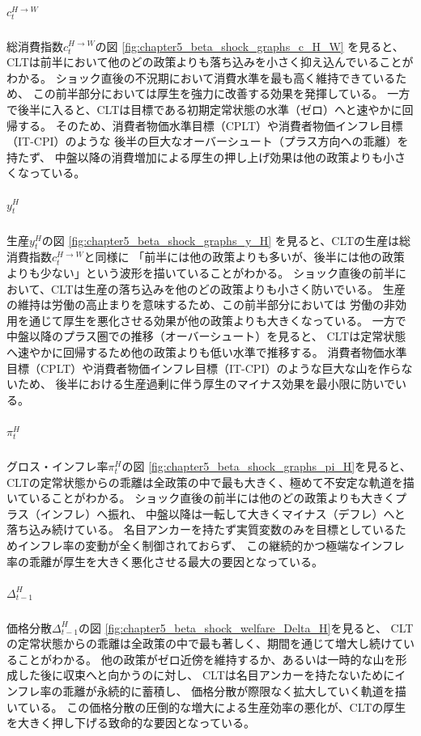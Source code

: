 \subparagraph{\(c_t^{H\to W}\)}
\label{sec:chapter5_beta_shock_policies_clt_c_H_W}
総消費指数\(c_t^{H\to W}\)の図
\ref{fig:chapter5_beta_shock_graphs_c_H_W}
を見ると、CLTは前半において他のどの政策よりも落ち込みを小さく抑え込んでいることがわかる。
ショック直後の不況期において消費水準を最も高く維持できているため、
この前半部分においては厚生を強力に改善する効果を発揮している。
一方で後半に入ると、CLTは目標である初期定常状態の水準（ゼロ）へと速やかに回帰する。
そのため、消費者物価水準目標（CPLT）や消費者物価インフレ目標（IT-CPI）のような
後半の巨大なオーバーシュート（プラス方向への乖離）を持たず、
中盤以降の消費増加による厚生の押し上げ効果は他の政策よりも小さくなっている。

\subparagraph{\(y_t^H\)}
\label{sec:chapter5_beta_shock_policies_clt_y_H}
生産\(y_t^H\)の図
\ref{fig:chapter5_beta_shock_graphs_y_H}
を見ると、CLTの生産は総消費指数\(c_t^{H\to W}\)と同様に
「前半には他の政策よりも多いが、後半には他の政策よりも少ない」という波形を描いていることがわかる。
ショック直後の前半において、CLTは生産の落ち込みを他のどの政策よりも小さく防いでいる。
生産の維持は労働の高止まりを意味するため、この前半部分においては
労働の非効用を通じて厚生を悪化させる効果が他の政策よりも大きくなっている。
一方で中盤以降のプラス圏での推移（オーバーシュート）を見ると、
CLTは定常状態へ速やかに回帰するため他の政策よりも低い水準で推移する。
消費者物価水準目標（CPLT）や消費者物価インフレ目標（IT-CPI）のような巨大な山を作らないため、
後半における生産過剰に伴う厚生のマイナス効果を最小限に防いでいる。

\subparagraph{\(\pi_t^H\)}
\label{sec:chapter5_beta_shock_policies_clt_pi_H}
グロス・インフレ率\(\pi_t^H\)の図
\ref{fig:chapter5_beta_shock_graphs_pi_H}を見ると、
CLTの定常状態からの乖離は全政策の中で最も大きく、極めて不安定な軌道を描いていることがわかる。
ショック直後の前半には他のどの政策よりも大きくプラス（インフレ）へ振れ、
中盤以降は一転して大きくマイナス（デフレ）へと落ち込み続けている。
名目アンカーを持たず実質変数のみを目標としているためインフレ率の変動が全く制御されておらず、
この継続的かつ極端なインフレ率の乖離が厚生を大きく悪化させる最大の要因となっている。

\subparagraph{\(\Delta_{t-1}^H\)}
\label{itm:chapter5_beta_shock_policies_clt_Delta_t_minus_1_H}
価格分散\(\Delta_{t-1}^H\)の図
\ref{fig:chapter5_beta_shock_welfare_Delta_H}を見ると、
CLTの定常状態からの乖離は全政策の中で最も著しく、期間を通じて増大し続けていることがわかる。
他の政策がゼロ近傍を維持するか、あるいは一時的な山を形成した後に収束へと向かうのに対し、
CLTは名目アンカーを持たないためにインフレ率の乖離が永続的に蓄積し、
価格分散が際限なく拡大していく軌道を描いている。
この価格分散の圧倒的な増大による生産効率の悪化が、CLTの厚生を大きく押し下げる致命的な要因となっている。